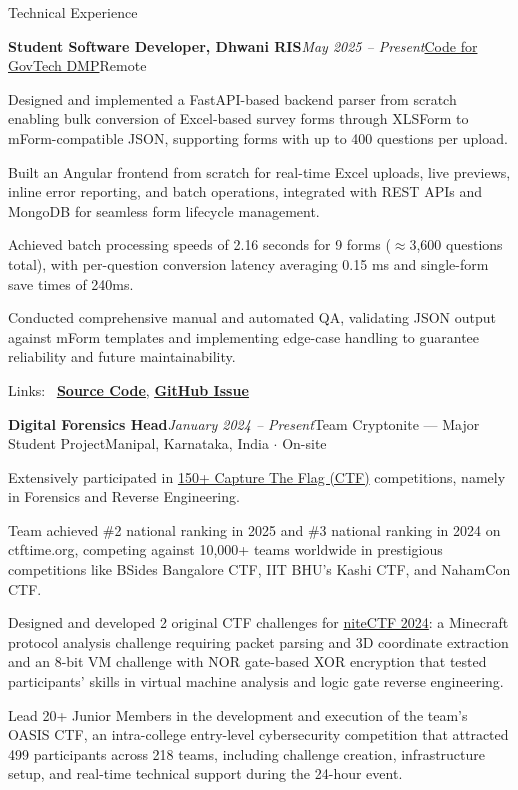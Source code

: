 \documentclass{resume} %
\begin{document}
\begin{rSection}{Technical Experience}

\begin{rSubsection}{\bf Student Software Developer, Dhwani RIS}{\em May 2025 -- Present}{\href{https://codeforgovtech.in/dedicated_mentoring_program/}{Code for GovTech DMP}}{Remote}
\item Designed and implemented a FastAPI-based backend parser from scratch enabling bulk conversion of Excel-based survey forms through XLSForm to mForm-compatible JSON, supporting forms with up to 400 questions per upload.
\item Built an Angular frontend from scratch for real-time Excel uploads, live previews, inline error reporting, and batch operations, integrated with REST APIs and MongoDB for seamless form lifecycle management.
\item Achieved batch processing speeds of 2.16 seconds for 9 forms ($\approx$3,600 questions total), with per-question conversion latency averaging 0.15 ms and single-form save times of 240ms.
\item Conducted comprehensive manual and automated QA, validating JSON output against mForm templates and implementing edge-case handling to guarantee reliability and future maintainability.
\item Links: \faGithub~\href{https://github.com/vee1e/bulk-questionnaire-upload}{\textbf{\underline{Source Code}}}, \href{https://github.com/dhwani-ris/bulk-questionnaire-upload/issues/1}{\textbf{\underline{GitHub Issue}}}
\end{rSubsection}

\begin{rSubsection}{\bf Digital Forensics Head}{\em January 2024 -- Present}{Team Cryptonite --- Major Student Project}{Manipal, Karnataka, India $\cdot$ On-site}
\item Extensively participated in \href{https://ctftime.org/team/62713/}{150+ Capture The Flag (CTF)} competitions, namely in Forensics and Reverse Engineering.
\item Team achieved \#2 national ranking in 2025 and \#3 national ranking in 2024 on ctftime.org, competing against 10,000+ teams worldwide in prestigious competitions like BSides Bangalore CTF, IIT BHU's Kashi CTF, and NahamCon CTF.
\item Designed and developed 2 original CTF challenges for \href{https://github.com/Cryptonite-MIT/niteCTF-2024/}{niteCTF 2024}: a Minecraft protocol analysis challenge requiring packet parsing and 3D coordinate extraction and an 8-bit VM challenge with NOR gate-based XOR encryption that tested participants' skills in virtual machine analysis and logic gate reverse engineering.
\item Lead 20+ Junior Members in the development and execution of the team's OASIS CTF, an intra-college entry-level cybersecurity competition that attracted 499 participants across 218 teams, including challenge creation, infrastructure setup, and real-time technical support during the 24-hour event.
\end{rSubsection}


\end{rSection}
\end{document}
